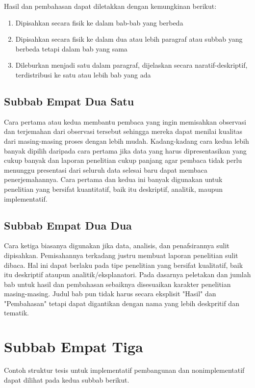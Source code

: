Hasil dan pembahasan dapat diletakkan dengan kemungkinan berikut:
\begin{enumerate}
  \item	Dipisahkan secara fisik ke dalam bab-bab yang berbeda
  \item Dipisahkan secara fisik ke dalam dua atau lebih paragraf atau subbab yang berbeda tetapi dalam bab yang sama
  \item Dileburkan menjadi satu dalam paragraf, dijelaskan secara naratif-deskriptif, terdistribusi ke satu atau lebih bab yang ada
\end{enumerate}

\subsection{Subbab Empat Dua Satu}

Cara pertama atau kedua membantu pembaca yang ingin memisahkan observasi dan terjemahan dari observasi tersebut sehingga mereka dapat menilai kualitas dari masing-masing proses dengan lebih mudah. Kadang-kadang cara kedua lebih banyak dipilih daripada cara pertama jika data yang harus dipresentasikan yang cukup banyak dan laporan penelitian cukup panjang agar pembaca tidak perlu menunggu presentasi dari seluruh data selesai baru dapat membaca penerjemahannya. Cara pertama dan kedua ini banyak digunakan untuk penelitian yang bersifat kuantitatif, baik itu deskriptif, analitik, maupun implementatif.    

\subsection{Subbab Empat Dua Dua}

Cara ketiga biasanya digunakan jika data, analisis, dan penafsirannya sulit dipisahkan. Pemisahannya terkadang justru membuat laporan penelitian sulit dibaca. Hal ini dapat berlaku pada tipe penelitian yang bersifat kualitatif, baik itu deskriptif ataupun analitik/eksplanatori. 
Pada dasarnya peletakan dan jumlah bab untuk hasil dan pembahasan sebaiknya disesuaikan karakter penelitian masing-masing. Judul bab pun tidak harus secara eksplisit "Hasil" dan "Pembahasan" tetapi dapat digantikan dengan nama yang lebih deskpritif dan tematik. 

\section{Subbab Empat Tiga}

Contoh struktur tesis untuk implementatif pembangunan dan nonimplementatif dapat dilihat pada kedua subbab berikut. 

